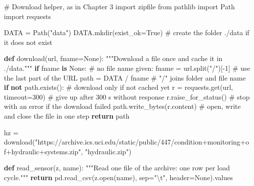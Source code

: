\documentclass[
  letterpaper,
  DIV=11,
  numbers=noendperiod]{scrreprt}
\newenvironment{Shaded}{\begin{snugshade}}{\end{snugshade}}
\newcommand{\BuiltInTok}[1]{\textcolor[rgb]{0.00,0.23,0.31}{#1}}
\newcommand{\CharTok}[1]{\textcolor[rgb]{0.13,0.47,0.30}{#1}}
\newcommand{\CommentTok}[1]{\textcolor[rgb]{0.37,0.37,0.37}{#1}}
\newcommand{\ControlFlowTok}[1]{\textcolor[rgb]{0.00,0.23,0.31}{\textbf{#1}}}
\newcommand{\DecValTok}[1]{\textcolor[rgb]{0.68,0.00,0.00}{#1}}
\newcommand{\ImportTok}[1]{\textcolor[rgb]{0.00,0.46,0.62}{#1}}
\newcommand{\KeywordTok}[1]{\textcolor[rgb]{0.00,0.23,0.31}{\textbf{#1}}}
\newcommand{\NormalTok}[1]{\textcolor[rgb]{0.00,0.23,0.31}{#1}}
\newcommand{\OperatorTok}[1]{\textcolor[rgb]{0.37,0.37,0.37}{#1}}
\newcommand{\StringTok}[1]{\textcolor[rgb]{0.13,0.47,0.30}{#1}}
\newcommand{\VariableTok}[1]{\textcolor[rgb]{0.07,0.07,0.07}{#1}}
\begin{document}
\begin{Shaded}
\begin{Highlighting}[]
\CommentTok{\# Download helper, as in Chapter 3}
\ImportTok{import}\NormalTok{ zipfile}
\ImportTok{from}\NormalTok{ pathlib }\ImportTok{import}\NormalTok{ Path}
\ImportTok{import}\NormalTok{ requests}

\NormalTok{DATA }\OperatorTok{=}\NormalTok{ Path(}\StringTok{"data"}\NormalTok{)}
\NormalTok{DATA.mkdir(exist\_ok}\OperatorTok{=}\VariableTok{True}\NormalTok{)                         }\CommentTok{\# create the folder ./data if it does not exist}

\KeywordTok{def}\NormalTok{ download(url, fname}\OperatorTok{=}\VariableTok{None}\NormalTok{):}
    \CommentTok{"""Download a file once and cache it in ./data."""}
    \ControlFlowTok{if}\NormalTok{ fname }\KeywordTok{is} \VariableTok{None}\NormalTok{:                             }\CommentTok{\# no file name given:}
\NormalTok{        fname }\OperatorTok{=}\NormalTok{ url.split(}\StringTok{"/"}\NormalTok{)[}\OperatorTok{{-}}\DecValTok{1}\NormalTok{]                }\CommentTok{\# use the last part of the URL}
\NormalTok{    path }\OperatorTok{=}\NormalTok{ DATA }\OperatorTok{/}\NormalTok{ fname                           }\CommentTok{\# "/" joins folder and file name}
    \ControlFlowTok{if} \KeywordTok{not}\NormalTok{ path.exists():                         }\CommentTok{\# download only if not cached yet}
\NormalTok{        r }\OperatorTok{=}\NormalTok{ requests.get(url, timeout}\OperatorTok{=}\DecValTok{300}\NormalTok{)        }\CommentTok{\# give up after 300 s without response}
\NormalTok{        r.raise\_for\_status()                      }\CommentTok{\# stop with an error if the download failed}
\NormalTok{        path.write\_bytes(r.content)               }\CommentTok{\# open, write and close the file in one step}
    \ControlFlowTok{return}\NormalTok{ path}

\NormalTok{hz }\OperatorTok{=}\NormalTok{ download(}\StringTok{"https://archive.ics.uci.edu/static/public/447/condition+monitoring+of+hydraulic+systems.zip"}\NormalTok{,}
              \StringTok{"hydraulic.zip"}\NormalTok{)}

\KeywordTok{def}\NormalTok{ read\_sensor(z, name):}
    \CommentTok{"""Read one file of the archive: one row per load cycle."""}
    \ControlFlowTok{return}\NormalTok{ pd.read\_csv(z.}\BuiltInTok{open}\NormalTok{(name), sep}\OperatorTok{=}\StringTok{"}\CharTok{\textbackslash{}t}\StringTok{"}\NormalTok{, header}\OperatorTok{=}\VariableTok{None}\NormalTok{).values}


\end{Highlighting}
\end{Shaded}
\end{document}
